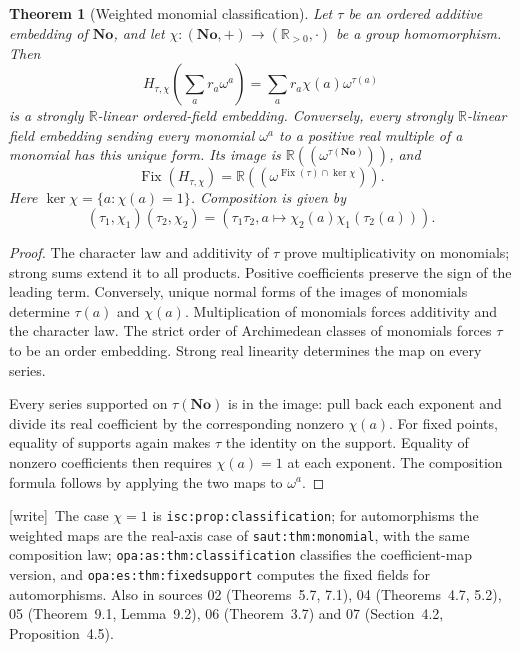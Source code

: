 \documentclass[11pt,a4paper]{article}
\numberwithin{equation}{section}
\theoremstyle{plain}
\newtheorem{theorem}{Theorem}[section]
\theoremstyle{definition}
\theoremstyle{remark}
\newcommand{\No}{\mathbf{No}}
\newcommand{\R}{\mathbb{R}}
\newcommand{\Fix}{\operatorname{Fix}}
\newcommand{\NF}[1]{\R((\omega^{#1}))}
\newcommand{\lbl}[1]{\nolinkurl{#1}}%
\newcommand{\wtag}{\textup{\textsf{[write]}}}%
\newenvironment{wnote}{\par\smallskip\noindent\wtag\ }{\par\smallskip}
\begin{document}
\begin{theorem}[Weighted monomial classification]\label{sse:thm:weighted}
Let $\tau$ be an ordered additive embedding of $\No$, and let
$\chi:(\No,+)\to(\R_{>0},\cdot)$ be a group homomorphism. Then
\begin{equation}\label{sse:eq:weighted}
 H_{\tau,\chi}\left(\sum_a r_a\omega^a\right)
 =\sum_a r_a\chi(a)\omega^{\tau(a)}
\end{equation}
is a strongly $\R$-linear ordered-field embedding. Conversely, every
strongly $\R$-linear field embedding sending every monomial $\omega^a$ to
a positive real multiple of a monomial has this unique form.
Its image is $\NF{\tau(\No)}$, and
\begin{equation}\label{sse:eq:weightedfixed}
 \Fix(H_{\tau,\chi})=
 \NF{\Fix(\tau)\cap\ker\chi}.
\end{equation}
Here $\ker\chi=\{a:\chi(a)=1\}$. Composition is given by
\[
 (\tau_1,\chi_1)(\tau_2,\chi_2)
 =\left(\tau_1\tau_2,
     a\longmapsto\chi_2(a)\chi_1(\tau_2(a))\right).
\]
\end{theorem}
\begin{proof}
The character law and additivity of $\tau$ prove multiplicativity on
monomials; strong sums extend it to all products. Positive coefficients
preserve the sign of the leading term. Conversely, unique normal forms of
the images of monomials determine $\tau(a)$ and $\chi(a)$. Multiplication
of monomials forces additivity and the character law. The strict order of
Archimedean classes of monomials forces $\tau$ to be an order embedding.
Strong real linearity determines the map on every series.

Every series supported on $\tau(\No)$ is in the image: pull back each
exponent and divide its real coefficient by the corresponding nonzero
$\chi(a)$. For fixed points, equality of supports again makes $\tau$ the
identity on the support. Equality of nonzero coefficients then requires
$\chi(a)=1$ at each exponent. The composition formula follows by applying
the two maps to $\omega^a$.
\end{proof}
\begin{wnote}The case $\chi=1$ is \lbl{isc:prop:classification}; for automorphisms the weighted maps are the real-axis case of \lbl{saut:thm:monomial}, with the same composition law; \lbl{opa:as:thm:classification} classifies the coefficient-map version, and \lbl{opa:es:thm:fixedsupport} computes the fixed fields for automorphisms. Also in sources 02 (Theorems~5.7, 7.1), 04 (Theorems~4.7, 5.2), 05 (Theorem~9.1, Lemma~9.2), 06 (Theorem~3.7) and 07 (Section~4.2, Proposition~4.5).\end{wnote}
\end{document}
